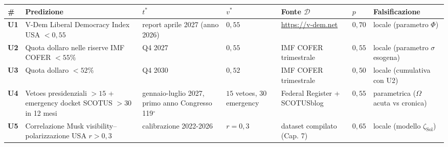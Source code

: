 {\def\LTcaptype{none} %
{\small\begin{longtable}[]{@{}
  >{\raggedright\arraybackslash}p{}
  >{\raggedright\arraybackslash}p{}
  >{\raggedright\arraybackslash}p{}
  >{\raggedright\arraybackslash}p{}
  >{\raggedright\arraybackslash}p{}
  >{\raggedright\arraybackslash}p{}
  >{\raggedright\arraybackslash}p{}@{}}
\toprule\noalign{}
\begin{minipage}[b]{\linewidth}\raggedright
\#
\end{minipage} & \begin{minipage}[b]{\linewidth}\raggedright
Predizione
\end{minipage} & \begin{minipage}[b]{\linewidth}\raggedright
\(t^*\)
\end{minipage} & \begin{minipage}[b]{\linewidth}\raggedright
\(v^*\)
\end{minipage} & \begin{minipage}[b]{\linewidth}\raggedright
Fonte \(\mathcal{D}\)
\end{minipage} & \begin{minipage}[b]{\linewidth}\raggedright
\(p\)
\end{minipage} & \begin{minipage}[b]{\linewidth}\raggedright
Falsificazione
\end{minipage} \\
\midrule\noalign{}
\endhead
\bottomrule\noalign{}
\endlastfoot
\textbf{U1} & V-Dem Liberal Democracy Index USA \(< 0{,}55\) & report
aprile 2027 (anno 2026) & \(0{,}55\) & \url{https://v-dem.net} &
\(0{,}70\) & locale (parametro \(\Phi\)) \\
\textbf{U2} & Quota dollaro nelle riserve IMF COFER \(< 55\%\) & Q4 2027
& \(0{,}55\) & IMF COFER trimestrale & \(0{,}55\) & locale (parametro
\(\sigma\) esogena) \\
\textbf{U3} & Quota dollaro \(< 52\%\) & Q4 2030 & \(0{,}52\) & IMF
COFER trimestrale & \(0{,}50\) & locale (cumulativa con U2) \\
\textbf{U4} & Vetoes presidenziali \(> 15\) + emergency docket SCOTUS
\(> 30\) in 12 mesi & gennaio-luglio 2027, primo anno Congresso 119$^\circ$ &
\(15\) vetoes, \(30\) emergency & Federal Register + SCOTUSblog &
\(0{,}55\) & parametrica (\(\Omega\) acuta vs cronica) \\
\textbf{U5} & Correlazione Musk visibility--polarizzazione USA
\(r > 0{,}3\) & calibrazione 2022-2026 & \(r = 0{,}3\) & dataset
compilato (Cap. 7) & \(0{,}65\) & locale (modello
\(\zeta_{\text{Sol}}\)) \\
\end{longtable}}
}

